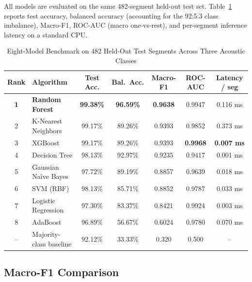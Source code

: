 \documentclass[conference]{IEEEtran}
\begin{document}
All models are evaluated on the same 482-segment held-out test set. Table~\ref{tab:results} reports test accuracy, balanced accuracy (accounting for the 92:5:3 class imbalance), Macro-F1, ROC-AUC (macro one-vs-rest), and per-segment inference latency on a standard CPU.

\begin{table}[t]
\caption{Eight-Model Benchmark on 482 Held-Out Test Segments Across Three Acoustic Classes}
\label{tab:results}
\centering
\renewcommand{\arraystretch}{1.3}
\begin{tabular}{clccccc}
\toprule
\textbf{Rank} & \textbf{Algorithm} & \textbf{Test Acc.} & \textbf{Bal.\ Acc.} & \textbf{Macro-F1} & \textbf{ROC-AUC} & \textbf{Latency / seg} \\
\midrule
\textbf{1} & \textbf{Random Forest}     & \textbf{99.38\%} & \textbf{96.59\%} & \textbf{0.9638} & 0.9947           & 0.116 ms \\
2          & K-Nearest Neighbors        & 99.17\%          & 89.26\%          & 0.9393           & 0.9852           & 0.373 ms \\
3          & XGBoost                    & 99.17\%          & 89.26\%          & 0.9393           & \textbf{0.9968}  & \textbf{0.007 ms} \\
4          & Decision Tree              & 98.13\%          & 92.97\%          & 0.9235           & 0.9417           & 0.001 ms \\
5          & Gaussian Na\"{i}ve Bayes   & 97.72\%          & 89.19\%          & 0.8857           & 0.9639           & 0.018 ms \\
6          & SVM (RBF)                  & 98.13\%          & 85.71\%          & 0.8852           & 0.9787           & 0.033 ms \\
7          & Logistic Regression        & 97.30\%          & 83.37\%          & 0.8421           & 0.9924           & 0.003 ms \\
8          & AdaBoost                   & 96.89\%          & 56.67\%          & 0.6024           & 0.9780           & 0.070 ms \\
\midrule
--         & Majority-class baseline    & 92.12\%          & 33.33\%          & 0.320            & 0.500            & -- \\
\bottomrule
\end{tabular}
\end{table}

\subsection{Macro-F1 Comparison}
\end{document}
